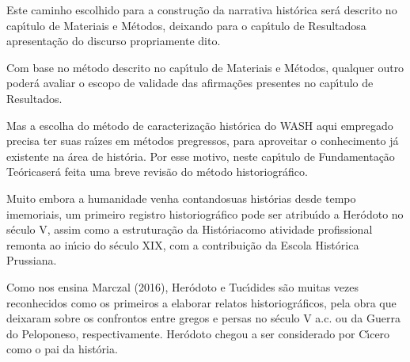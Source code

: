\documentclass[
12pt,		%
openright,	%
twoside,  %
a4paper,			%
chapter=TITLE,		%
english,			%
french,				%
spanish,			%
brazil				%
]{USPSC-classe/USPSC_RedarTex}
\begin{document}
Este caminho escolhido para a constru\c{c}\~ao da narrativa hist\'orica ser\'a descrito no cap\'{\i}tulo de \textquotedbl Materiais e M\'etodos\textquotedbl , deixando para o cap\'{\i}tulo de \textquotedbl Resultados\textquotedbl  a apresenta\c{c}\~ao do discurso propriamente dito.








Com base no m\'etodo descrito no cap\'{\i}tulo de \textquotedbl Materiais e M\'etodos\textquotedbl , qualquer outro poder\'a avaliar o escopo de validade das afirma\c{c}\~oes presentes no cap\'{\i}tulo de \textquotedbl Resultados\textquotedbl .








Mas a escolha do m\'etodo de caracteriza\c{c}\~ao hist\'orica do WASH aqui empregado precisa ter suas ra\'{\i}zes em m\'etodos pregressos, para aproveitar o conhecimento j\'a existente na \'area de hist\'oria. Por esse motivo, neste cap\'{\i}tulo de \textquotedbl Fundamenta\c{c}\~ao Te\'orica\textquotedbl  ser\'a feita uma breve revis\~ao do m\'etodo historiogr\'afico.








Muito embora a humanidade venha \textquotedbl contando\textquotedbl  suas hist\'orias desde tempo imemoriais, um primeiro registro historiogr\'afico pode ser atribu\'{\i}do a Her\'odoto no s\'eculo V, assim como a estrutura\c{c}\~ao da \textquotedbl Hist\'oria\textquotedbl  como atividade profissional remonta ao in\'{\i}cio do s\'eculo XIX, com a contribui\c{c}\~ao da Escola Hist\'orica Prussiana.








Como nos ensina  Marczal (2016),  Her\'odoto e Tuc\'{\i}dides s\~ao muitas vezes reconhecidos como os primeiros a elaborar relatos historiogr\'aficos, pela obra que deixaram sobre os confrontos entre gregos e persas no s\'eculo V a.c. ou da Guerra do Peloponeso, respectivamente. Her\'odoto chegou a ser considerado por C\'{\i}cero como o \textquotedbl pai da hist\'oria\textquotedbl  [XXX].
\end{document}
